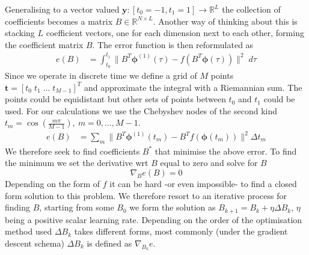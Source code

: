 \documentclass[11pt]{report}
\begin{document}
    Generalising to a vector valued $\pmb{y} : [t_0=-1,t_1=1] \to \mathbb{R}^L$ the collection of coefficients becomes a matrix $B\in \mathbb{R}^{N \times L}$.
    Another way of thinking about this is stacking $L$ coefficient vectors, one for each dimension next to each other, forming the coefficient matrix $B$.
    The error function is then reformulated as
    \begin{align}
        e(B) &= \int_{t_0}^{t_1} \lVert
        B^T \pmb{\phi}^{(1)}(\tau)   -
        f (B^T  \pmb\phi(\tau)  )
        \rVert^2
        \; d\tau
        \label{approx_error}
    \end{align}
    Since we operate in discrete time we define a grid of $M$ points $\pmb{t} = [t_0 \; t_1 \; \dots \; t_{M-1}]^T$ and
    approximate the integral with a Riemannian sum.
    The points could be equidistant but other sets of points between $t_0$ and $t_1$ could be used.
    For our calculations we use the Chebyshev nodes of the second kind $t_m = \cos\left( \frac{m\pi}{M-1} \right), \ m=0,\dots,M-1$.
    \begin{align}
        e(B) &= \sum_m \lVert
        B^T \pmb{\phi}^{(1)}(t_m)  -
        B^T f (  \pmb\phi(t_m)  )
        \rVert^2
        \Delta t_m
        \label{approx_error_sum}
    \end{align}
    We therefore seek to find coefficients $B^*$ that minimise the above error.
    To find the minimum we set the derivative wrt $B$ equal to zero and solve for $B$
    \begin{equation}
        \label{eq:error_zero}
        \nabla_B e(B) = 0
    \end{equation}
    Depending on the form of $f$ it can be hard -or even impossible- to find a closed form solution to this problem.
    We therefore resort to an iterative process for finding $B$, starting from some $B_0$ we form the solution as
    $B_{k+1} = B_{k} + \eta \Delta B_{k}$, $\eta$ being a positive scalar learning rate.
    Depending on the order of the optimisation method used $\Delta B_{k}$ takes different forms, most
    commonly (under the gradient descent schema) $\Delta B_{k}$ is defined as $\nabla_{B_{k}} e$.
\end{document}
